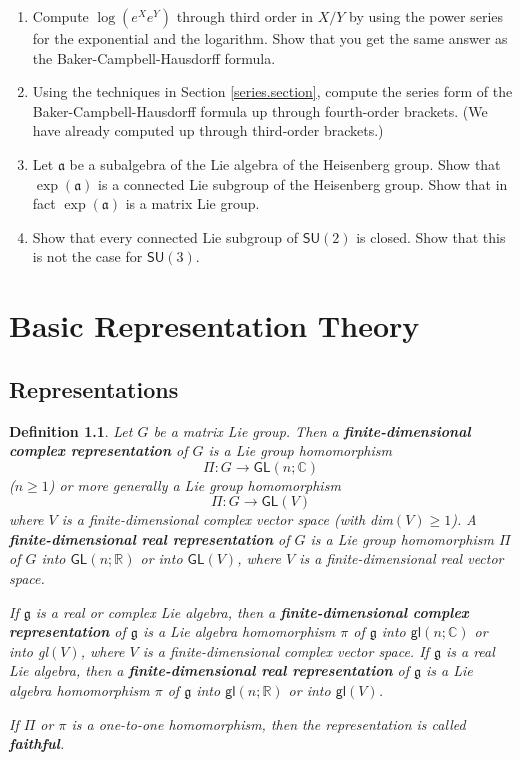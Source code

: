 \documentclass{amsbook}
\let \frak = \mathfrak
\theoremstyle{plain}
\newtheorem{definition}[theorem]{Definition}
\numberwithin{equation}{chapter}
\numberwithin{theorem}{chapter}
\begin{document}
\begin{enumerate}
\item \label{by.series}Compute $\log\left(  e^{X}e^{Y}\right)  $ through third
order in $X/Y$ by using the power series for the exponential and the
logarithm. Show that you get the same answer as the Baker-Campbell-Hausdorff formula.

\item  Using the techniques in Section \ref{series.section}, compute the
series form of the Baker-Campbell-Hausdorff formula up through fourth-order
brackets. (We have already computed up through third-order brackets.)

\item \label{sub.heisenberg}Let $\frak{a}$ be a subalgebra of the Lie algebra
of the Heisenberg group. Show that $\exp\left(  \frak{a}\right)  $ is a
connected Lie subgroup of the Heisenberg group. Show that in fact $\exp\left(
\frak{a}\right)  $ is a matrix Lie group.

\item  Show that every connected Lie subgroup of $\mathsf{SU}\left(  2\right)
$ is closed. Show that this is not the case for $\mathsf{SU}\left(  3\right)
$.
\end{enumerate}

\chapter{Basic Representation Theory}

\section{Representations}

\begin{definition}
Let $G$ be a matrix Lie group. Then a \textbf{finite-dimensional complex
representation} of $G$ is a Lie group homomorphism
\[
\Pi:G\rightarrow\mathsf{GL}(n;\mathbb{C})
\]
($n\geq1$) or more generally a Lie group homomorphism
\[
\Pi:G\rightarrow\mathsf{GL}(V)
\]
where $V$ is a finite-dimensional complex vector space (with dim$(V)\geq1$). A
\textbf{finite-dimensional real representation} of $G$ is a Lie group
homomorphism $\Pi$ of $G$ into $\mathsf{GL}(n;\mathbb{R})$ or into
$\mathsf{GL}(V)$, where $V$ is a finite-dimensional real vector space.

If $\frak{g}$ is a real or complex Lie algebra, then a
\textbf{finite-dimensional complex representation} of $\frak{g}$ is a Lie
algebra homomorphism $\pi$ of $\frak{g}$ into $\mathsf{gl}(n;\mathbb{C})$ or
into \textsf{gl}$(V)$, where $V$ is a finite-dimensional complex vector space.
If $\frak{g}$ is a \textit{real} Lie algebra, then a
\textbf{finite-dimensional real representation} of $\frak{g}$ is a Lie algebra
homomorphism $\pi$ of $\frak{g}$ into $\mathsf{gl}(n;\mathbb{R})$ or into
$\mathsf{gl}(V)$.

If $\Pi$ or $\pi$ is a one-to-one homomorphism, then the representation is
called \textbf{faithful}.
\end{definition}
\end{document}
